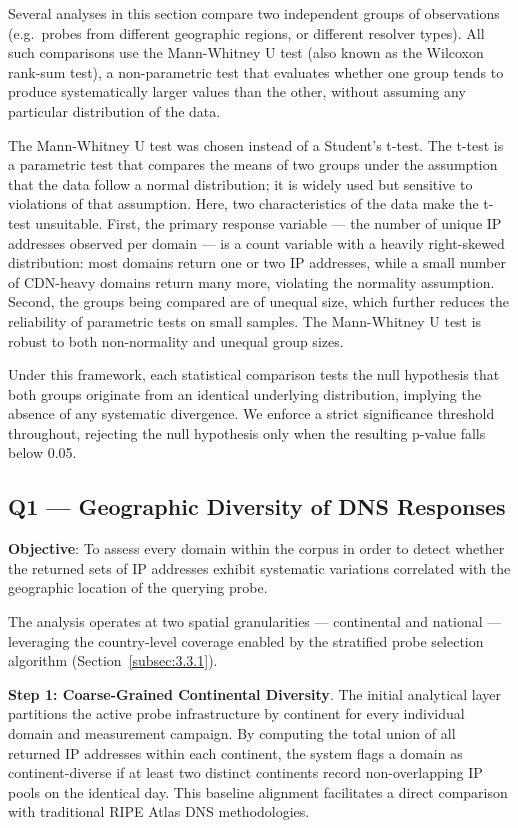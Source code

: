 Several analyses in this section compare two independent groups of observations (e.g.\ probes from different geographic regions, or different resolver types). All such comparisons use the Mann-Whitney U test (also known as the Wilcoxon rank-sum test), a non-parametric test that evaluates whether one group tends to produce systematically larger values than the other, without assuming any particular distribution of the data.

The Mann-Whitney U test was chosen instead of a Student's t-test. The t-test is a parametric test that compares the means of two groups under the assumption that the data follow a normal distribution; it is widely used but sensitive to violations of that assumption. Here, two characteristics of the data make the t-test unsuitable. First, the primary response variable --- the number of unique \ac{IP} addresses observed per domain --- is a count variable with a heavily right-skewed distribution: most domains return one or two \ac{IP} addresses, while a small number of \ac{CDN}-heavy domains return many more, violating the normality assumption. Second, the groups being compared are of unequal size, which further reduces the reliability of parametric tests on small samples. The Mann-Whitney U test is robust to both non-normality and unequal group sizes.

Under this framework, each statistical comparison tests the null hypothesis that both groups originate from an identical underlying distribution, implying the absence of any systematic divergence. We enforce a strict significance threshold throughout, rejecting the null hypothesis only when the resulting p-value falls below 0.05.

\subsection{Q1 --- Geographic Diversity of DNS Responses}
\label{subsec:3.5.2}

\textbf{Objective}: To assess every domain within the corpus in order to detect whether the returned sets of \ac{IP} addresses exhibit systematic variations correlated with the geographic location of the querying probe.

The analysis operates at two spatial granularities --- continental and national --- leveraging the country-level coverage enabled by the stratified probe selection algorithm (Section~\ref{subsec:3.3.1}).

\textbf{Step 1: Coarse-Grained Continental Diversity}. The initial analytical layer partitions the active probe infrastructure by continent for every individual domain and measurement campaign. By computing the total union of all returned \ac{IP} addresses within each continent, the system flags a domain as continent-diverse if at least two distinct continents record non-overlapping \ac{IP} pools on the identical day. This baseline alignment facilitates a direct comparison with traditional RIPE Atlas \ac{DNS} methodologies.


